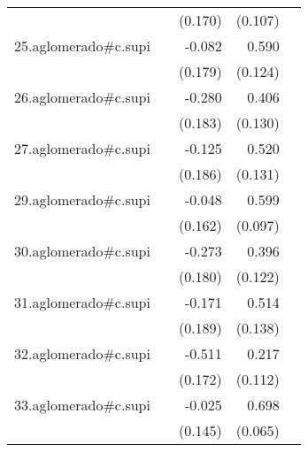{\begin{longtable}{l*{4}{D{.}{.}{-1}}}
            &                     &     (0.170)         &     (0.107)         &                     \\
\addlinespace
25.aglomerado#c.supi&                     &      -0.082         &       0.590\sym{***}&                     \\
            &                     &     (0.179)         &     (0.124)         &                     \\
\addlinespace
26.aglomerado#c.supi&                     &      -0.280         &       0.406\sym{**} &                     \\
            &                     &     (0.183)         &     (0.130)         &                     \\
\addlinespace
27.aglomerado#c.supi&                     &      -0.125         &       0.520\sym{***}&                     \\
            &                     &     (0.186)         &     (0.131)         &                     \\
\addlinespace
29.aglomerado#c.supi&                     &      -0.048         &       0.599\sym{***}&                     \\
            &                     &     (0.162)         &     (0.097)         &                     \\
\addlinespace
30.aglomerado#c.supi&                     &      -0.273         &       0.396\sym{**} &                     \\
            &                     &     (0.180)         &     (0.122)         &                     \\
\addlinespace
31.aglomerado#c.supi&                     &      -0.171         &       0.514\sym{***}&                     \\
            &                     &     (0.189)         &     (0.138)         &                     \\
\addlinespace
32.aglomerado#c.supi&                     &      -0.511\sym{**} &       0.217         &                     \\
            &                     &     (0.172)         &     (0.112)         &                     \\
\addlinespace
33.aglomerado#c.supi&                     &      -0.025         &       0.698\sym{***}&                     \\
            &                     &     (0.145)         &     (0.065)         &                     \\

\end{longtable}}
